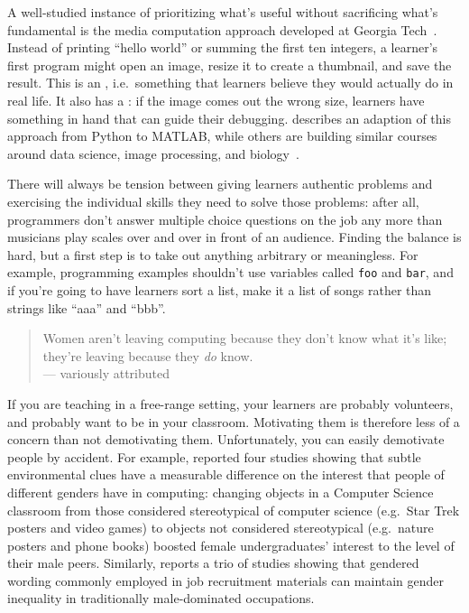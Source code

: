 A well-studied instance of prioritizing what's useful
without sacrificing what's fundamental
is the media computation approach developed at Georgia Tech~\cite{Guzd2013}.
Instead of printing ``hello world'' or summing the first ten integers,
a learner's first program might open an image,
resize it to create a thumbnail,
and save the result.
This is an ,
i.e.\ something that learners believe they would actually do in real life.
It also has a :
if the image comes out the wrong size,
learners have something in hand that can guide their debugging.
\cite{Lee2013} describes an adaption of this approach from Python to MATLAB,
while others are building similar courses around data science, image processing,
and biology~\cite{Dahl2018,Meys2018,Ritz2018}.

There will always be tension between giving learners authentic problems
and exercising the individual skills they need to solve those problems:
after all,
programmers don't answer multiple choice questions on the job
any more than musicians play scales over and over in front of an audience.
Finding the balance is hard,
but a first step is to take out anything arbitrary or meaningless.
For example,
programming examples shouldn't use variables called \texttt{foo} and \texttt{bar},
and if you're going to have learners sort a list,
make it a list of songs rather than strings like ``aaa'' and ``bbb''.


\begin{quote}

  Women aren't leaving computing because they don't know what it's like;
  they're leaving because they \emph{do} know. \\
  --- variously attributed

\end{quote}

If you are teaching in a free-range setting,
your learners are probably volunteers,
and probably want to be in your classroom.
Motivating them is therefore less of a concern than not demotivating them.
Unfortunately,
you can easily demotivate people by accident.
For example,
\cite{Cher2009} reported four studies showing that
subtle environmental clues have a measurable difference on the interest that people of different genders have in computing:
changing objects in a Computer Science classroom from those considered stereotypical of computer science
(e.g.\ Star Trek posters and video games)
to objects not considered stereotypical (e.g.\ nature posters and phone books)
boosted female undergraduates' interest to the level of their male peers.
Similarly,
\cite{Gauc2011} reports a trio of studies showing that
gendered wording commonly employed in job recruitment materials
can maintain gender inequality in traditionally male-dominated occupations.

